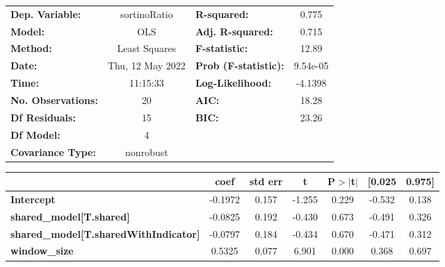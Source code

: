 \begin{center}
\begin{tabular}{lclc}
\toprule
\textbf{Dep. Variable:}                       &   sortinoRatio   & \textbf{  R-squared:         } &     0.775   \\
\textbf{Model:}                               &       OLS        & \textbf{  Adj. R-squared:    } &     0.715   \\
\textbf{Method:}                              &  Least Squares   & \textbf{  F-statistic:       } &     12.89   \\
\textbf{Date:}                                & Thu, 12 May 2022 & \textbf{  Prob (F-statistic):} &  9.54e-05   \\
\textbf{Time:}                                &     11:15:33     & \textbf{  Log-Likelihood:    } &   -4.1398   \\
\textbf{No. Observations:}                    &          20      & \textbf{  AIC:               } &     18.28   \\
\textbf{Df Residuals:}                        &          15      & \textbf{  BIC:               } &     23.26   \\
\textbf{Df Model:}                            &           4      & \textbf{                     } &             \\
\textbf{Covariance Type:}                     &    nonrobust     & \textbf{                     } &             \\
\bottomrule
\end{tabular}
\begin{tabular}{lcccccc}
                                              & \textbf{coef} & \textbf{std err} & \textbf{t} & \textbf{P$> |$t$|$} & \textbf{[0.025} & \textbf{0.975]}  \\
\midrule
\textbf{Intercept}                            &      -0.1972  &        0.157     &    -1.255  &         0.229        &       -0.532    &        0.138     \\
\textbf{shared\_model[T.shared]}              &      -0.0825  &        0.192     &    -0.430  &         0.673        &       -0.491    &        0.326     \\
\textbf{shared\_model[T.sharedWithIndicator]} &      -0.0797  &        0.184     &    -0.434  &         0.670        &       -0.471    &        0.312     \\
\textbf{window\_size}                         &       0.5325  &        0.077     &     6.901  &         0.000        &        0.368    &        0.697     \\

\end{tabular}
\end{center}
